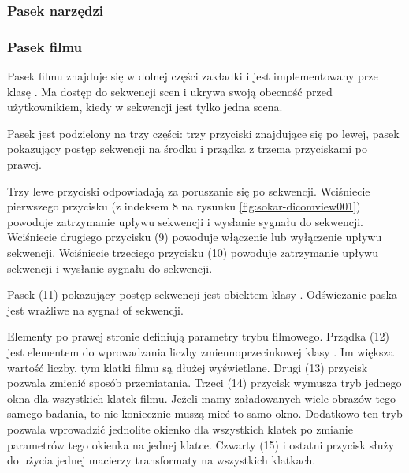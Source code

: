 \subsubsection{Pasek narzędzi}


\subsubsection{}
\label{sec:sokar-dicomgraphics}

\subsubsection{Pasek filmu}
\label{sec:sokar-moviebar}

\par
Pasek filmu znajduje się w dolnej części zakładki i jest implementowany prze klasę .
Ma dostęp do sekwencji scen i ukrywa swoją obecność przed użytkownikiem, kiedy w sekwencji jest tylko jedna scena.

\par
Pasek jest podzielony na trzy części: trzy przyciski znajdujące się po lewej, pasek pokazujący postęp sekwencji na środku i prządka z trzema przyciskami po prawej.

\par
Trzy lewe przyciski odpowiadają za poruszanie się po sekwencji.
Wciśniecie pierwszego przycisku (z indeksem 8 na rysunku \ref{fig:sokar-dicomview001}) powoduje zatrzymanie upływu sekwencji i wysłanie sygnału  do sekwencji.
Wciśniecie drugiego przycisku (9) powoduje włączenie lub wyłączenie upływu sekwencji.
Wciśniecie trzeciego przycisku (10) powoduje zatrzymanie upływu sekwencji i wysłanie sygnału  do sekwencji.
\par
Pasek (11) pokazujący postęp sekwencji jest obiektem klasy .
Odświeżanie paska jest wrażliwe na sygnał  of sekwencji.
\par
Elementy po prawej stronie definiują parametry trybu filmowego.
Prządka (12) jest elementem do wprowadzania liczby zmiennoprzecinkowej klasy .
Im większa wartość liczby, tym klatki filmu są dłużej wyświetlane.
Drugi (13) przycisk pozwala zmienić sposób przemiatania.
Trzeci (14) przycisk wymusza tryb jednego okna dla wszystkich klatek filmu.
Jeżeli mamy załadowanych wiele obrazów tego samego badania, to nie koniecznie muszą mieć to samo okno.
Dodatkowo ten tryb pozwala wprowadzić jednolite okienko dla wszystkich klatek po zmianie parametrów tego okienka na jednej klatce.
Czwarty (15) i ostatni przycisk służy do użycia jednej macierzy transformaty na wszystkich klatkach.

